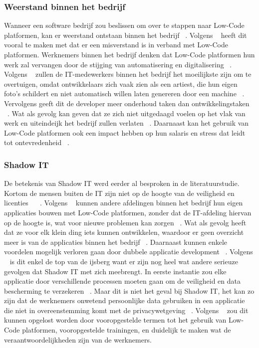\subsubsection*{Weerstand binnen het bedrijf}
\label{subsec:weerstand-binnen-het-bedrijf}
Wanneer een software bedrijf zou beslissen om over te stappen naar Low-Code platformen, kan er weerstand ontstaan binnen het bedrijf ~\autocite{Elshan2023}.
Volgens ~\textcite{Elshan2023} heeft dit vooral te maken met dat er een misverstand is in verband met Low-Code platformen. Werknemers binnen het bedrijf denken dat Low-Code platformen
hun werk zal vervangen door de stijging van automatisering en digitalisering ~\autocite{Elshan2023}. Volgens ~\textcite{Elshan2023} zullen de IT-medewerkers binnen het bedrijf
het moeilijkste zijn om te overtuigen, omdat ontwikkelaars zich vaak zien als een artiest, die hun eigen foto's schildert en niet automatisch willen laten genereren door een machine ~\autocite{Elshan2023}.
Vervolgens geeft dit de developer meer onderhoud taken dan ontwikkelingstaken ~\autocite{Elshan2023}. Wat als gevolg kan geven dat ze zich niet uitgedaagd voelen op het vlak van werk en uiteindeijk
het bedrijf zullen verlaten ~\autocite{Elshan2023}. Daarnaast kan het gebruik van Low-Code platformen ook een impact hebben op hun salaris en stress dat leidt tot ontevredenheid ~\autocite{Elshan2023}.


\subsubsection*{Shadow IT}
\label{subsec:shadow-it}
De betekenis van Shadow IT werd eerder al besproken in de literatuurstudie. Kortom de mensen buiten de IT zijn niet op de hoogte van de veiligheid en licenties ~\autocite{Yan2021} ~\autocite{Rokis_2022}.
Volgens ~\textcite{Elshan2023} kunnen andere afdelingen binnen het bedrijf hun eigen applicaties bouwen met Low-Code platformen, zonder dat de IT-afdeling hiervan op de hoogte is, wat voor nieuwe problemen kan zorgen ~\autocite{Elshan2023}.
Wat als gevolg heeft dat ze voor elk klein ding iets kunnen ontwikkelen, waardoor er geen overzicht meer is van de applicaties binnen het bedrijf ~\autocite{Elshan2023}. Daarnaast kunnen enkele voordelen mogelijk verloren gaan
door dubbele applicatie development ~\autocite{Elshan2023}. Volgens ~\textcite{Elshan2023} is dit enkel de top van de ijsberg want er zijn nog heel wat andere serieuze gevolgen dat Shadow IT met zich meebrengt.
In eerste instantie zou elke applicatie door verschillende processen moeten gaan om de veiligheid en data bescherming te verzekeren ~\autocite{Elshan2023}. Maar dit is niet het geval bij Shadow IT,
het kan zo zijn dat de werknemers onwetend persoonlijke data gebruiken in een applicatie die niet in overeenstemming komt met de privacywetgeving  ~\autocite{Elshan2023}. Volgens ~\textcite{Elshan2023}
zou dit kunnen opgelost worden door vooropgestelde termen tot het gebruik van Low-Code platformen, vooropgestelde trainingen, en duidelijk te maken wat de veraantwoordelijkheden zijn van de werknemers.

